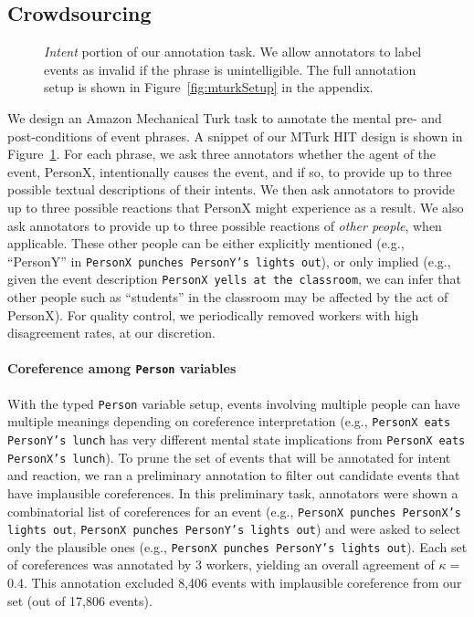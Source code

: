 \documentclass[11pt,a4paper]{article}
\begin{document}
\subsection{Crowdsourcing}
\begin{figure}[t]
    \centering
    \caption{\textit{Intent} portion of our annotation task. We allow annotators to label events as invalid if the phrase is unintelligible. The full annotation setup is shown in Figure~\ref{fig:mturkSetup} in the appendix.
    \label{fig:mturkSetupShort}}
\end{figure}
We design an Amazon Mechanical Turk task to annotate the mental pre- and post-conditions of event phrases. A snippet of our MTurk HIT design is shown in Figure~\ref{fig:mturkSetupShort}.
For each phrase, we ask three annotators whether the agent of the event, PersonX, intentionally causes the event, and if so, to provide up to three possible textual descriptions of their intents.
We then ask annotators to provide up to three possible reactions that PersonX might experience as a result. 
We also ask annotators to provide up to three possible reactions of \emph{other people}, when applicable. These other people can be either explicitly mentioned (e.g., ``PersonY'' in \texttt{PersonX punches PersonY's lights out}), or only implied (e.g., given the event description \texttt{PersonX yells at the classroom}, we can infer that other people such as ``students'' in the classroom may be affected by the act of PersonX). 
For quality control, 
we periodically removed workers with high disagreement rates, at our discretion.





\paragraph{Coreference among \texttt{Person} variables} 
With the typed \texttt{Person} variable setup, events involving multiple people can have multiple meanings depending on coreference interpretation (e.g., \texttt{PersonX eats PersonY's lunch} has very different mental state implications from \texttt{PersonX eats PersonX's lunch}).
To prune the set of events that will be annotated for intent and reaction, we ran a preliminary annotation to filter out candidate events that have implausible coreferences.
In this preliminary task, annotators were shown a combinatorial list of coreferences for an event (e.g., \texttt{PersonX punches PersonX's lights out}, \texttt{PersonX punches PersonY's lights out}) and were asked to select only the plausible ones (e.g., \texttt{PersonX punches PersonY's lights out}).
Each set of coreferences was annotated by 3  workers, yielding an overall agreement of  $\kappa=$0.4.
This annotation excluded 8,406 events with implausible coreference from our set (out of 17,806 events).
\end{document}
